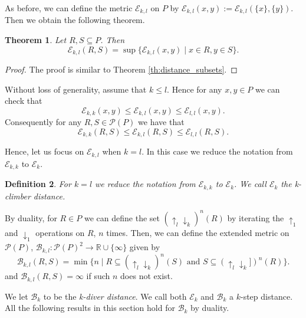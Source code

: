\documentclass{article}[12pt]
\theoremstyle{exampstyle}
\newtheorem{theorem}{Theorem}[section]
\newtheorem{definition}[theorem]{Definition}
\theoremstyle{remark}
\newcommand{\R}{\mathbb{R}}
\newcommand{\B}{\mathcal{B}}
\newcommand{\E}{\mathcal{E}}
\renewcommand{\P}{\mathcal{P}}
\begin{document}
As before, we can define the metric $\E_{k,l}$ on $P$ by $\E_{k,l}(x,y) := \E_{k,l}(\{x\},\{y\})$. Then we obtain the following theorem.
 
\begin{theorem}
    Let $R,S \subseteq P $. Then
    \begin{equation*}
        \E_{k,l}(R,S) = \sup\{ \E_{k,l}(x,y) \mid  x \in R, y \in S \}.
    \end{equation*}
\end{theorem}
\begin{proof}
    The proof is similar to  Theorem \ref{th:distance_subsets}.
\end{proof}

Without loss of generality, assume that $k \leq l$. Hence for any $x,y \in P$ we can check that 
\[ \E_{k,k}(x,y) \leq \E_{k,l}(x,y) \leq \E_{l,l}(x,y).\] Consequently for any $R,S \in \P(P)$ we have that 
\[ \E_{k,k}(R,S) \leq \E_{k,l}(R,S) \leq \E_{l,l}(R,S).\]

Hence, let us focus on $\E_{k,l}$ when $k = l$. In this case we reduce the notation from $\E_{k,k}$ to $\E_{k}$. 

\begin{definition}
    For $k = l$ we reduce the notation from $\E_{k,k}$ to $\E_{k}$.  We call $\E_{k}$ the \textit{k-climber distance}. 
\end{definition}

 By duality, for $R \in P$ we can define the set $(\uparrow_l\downarrow_k)^n(R)$ by iterating the $\uparrow_1$ and $\downarrow_1$ operations on $R$, $n$ times. Then, we can define the extended metric on $\P(P)$, $\B_{k,l}: \P(P)^ 2 \to \R \cup \{ \infty\}$ given by 
    \begin{equation*}
        \B_{k,l}(R,S) = \min \{ n \mid R \subseteq (\uparrow_l\downarrow_k)^{n} (S) \text{ and } S \subseteq (\uparrow_l\downarrow_k])^{n} (R) \}.
    \end{equation*}
    and $\B_{k,l}(R,S) = \infty$ if such $n$ does not exist.

We let $\B_{k}$ to be the \textit{k-diver distance}. We call both $\E_{k}$ and $\B_{k}$ a $k$-step distance. All the following results in this section hold for $\B_k$ by duality.
\end{document}
